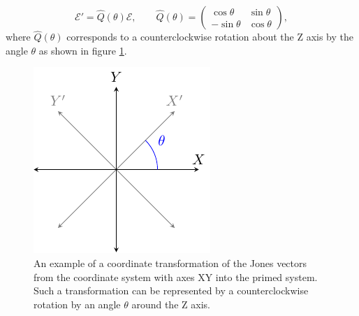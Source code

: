 \begin{equation}
    \label{eq:jones_vector_transformation}
    \bm{\mathcal{E}}' = \hat{Q}(\theta) \bm{\mathcal{E}}, \qquad
    \hat{Q}(\theta) =
    \begin{pmatrix}
    \cos \theta & \sin \theta \\
    -\sin \theta & \cos \theta
    \end{pmatrix},
\end{equation}
where $\hat{Q}(\theta)$ corresponds to a counterclockwise rotation about the Z axis by the angle $\theta$ as shown in figure \ref{fig:frame_rotation}. 

\begin{figure}[h]
    \centering
    \includegraphics[scale=1]{images/theory/tikz_frame_rotation.pdf}
    \caption{An example of a coordinate transformation of the Jones vectors from the coordinate system with axes XY into the primed system. Such a transformation can be represented by a counterclockwise rotation by an angle $\theta$ around the Z axis.}
    \label{fig:frame_rotation}
\end{figure}

